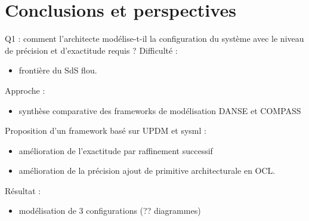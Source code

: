 \section{Conclusions et perspectives}

\begin{frame}{Q1 : comment l’architecte modélise-t-il la configuration du système avec le niveau de précision et d’exactitude requis ?}
Difficulté : 
\begin{itemize}
\item frontière du SdS flou.\\
\end{itemize}


Approche : 
\begin{itemize}
\item synthèse comparative des frameworks de modélisation DANSE et COMPASS
\end{itemize}

Proposition d'un framework basé sur UPDM et sysml : 
\begin{itemize}
\item amélioration de l'exactitude par raffinement successif 
\item amélioration de la précision ajout de primitive architecturale
en OCL.
\end{itemize} 
Résultat : 
\begin{itemize}
\item modélisation de 3 configurations (?? diagrammes)
\end{itemize}
\end{frame}


